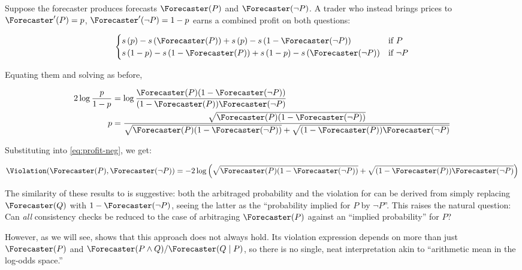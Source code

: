 Suppose the forecaster produces forecasts $\Forecaster(P)$ and $\Forecaster(\lnot P)$. A trader who instead brings prices to $\Forecaster'(P)=\consp$, $\Forecaster'(\lnot P)=1-\consp$ earns a combined profit on both questions:

\begin{equation}
\begin{cases}
    \score{\consp}-\score{\priceP}+\score{\consp}-\score{1-\pricenotP} & \text{if } P \\
    \score{1-\consp}-\score{1-\priceP}+\score{1-\consp}-\score{\pricenotP} & \text{if } \lnot P
\end{cases}
\label{eq:profit-neg}
\end{equation}

Equating them and solving as before,

\begin{align*}
    2\log\frac{\consp}{1-\consp} &=
    \log\frac{\priceP(1-\pricenotP)}{(1-\priceP)\pricenotP} \\
    \consp &=
    \frac{\sqrt{\priceP(1-\pricenotP)}}{\sqrt{\priceP(1-\pricenotP)}+\sqrt{(1-\priceP)\pricenotP}} \\
\end{align*}

Substituting into \eqref{eq:profit-neg}, we get:

\begin{equation}
    \Violation(\priceP,\pricenotP)=-2\log\left(\sqrt{\priceP(1-\pricenotP)}+\sqrt{(1-\priceP)\pricenotP}\right)
\end{equation}

The similarity of these results to \ParaphraseChecker{} is suggestive: both the arbitraged probability and the violation for \NegChecker{} can be derived from \ParaphraseChecker{} simply replacing $\priceQ$ with $1-\pricenotP$, seeing the latter as the ``probability implied for $P$ by $\lnot P$''.
This raises the natural question: Can \emph{all} consistency checks be reduced to the case of \ParaphraseChecker{} arbitraging $\Forecaster(P)$ against an ``implied probability'' for $P$?

However, as we will see, \CondChecker{} shows that this approach does not always hold. Its violation expression depends on more than just $\Forecaster(P)$ and $\Forecaster(P\land Q)/\Forecaster(Q\mid P)$, so there is no single, neat interpretation akin to “arithmetic mean in the log-odds space.”



